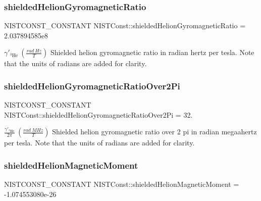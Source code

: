 \subsubsection{\texorpdfstring{shielded\+Helion\+Gyromagnetic\+Ratio}{shieldedHelionGyromagneticRatio}}
{\footnotesize\ttfamily N\+I\+S\+T\+C\+O\+N\+S\+T\+\_\+\+C\+O\+N\+S\+T\+A\+NT N\+I\+S\+T\+Const\+::shielded\+Helion\+Gyromagnetic\+Ratio = 2.\+037894585e8}

$\gamma'_{^3\textrm{He}} \ (\frac{rad\ Hz}{T})$ Shielded helion gyromagnetic ratio in radian hertz per tesla. Note that the units of radians are added for clarity. \mbox{\label{group___n_i_s_t_const-_helion_gae89da246fab4d96613f6365bc4c895cf}} 
\subsubsection{\texorpdfstring{shielded\+Helion\+Gyromagnetic\+Ratio\+Over2\+Pi}{shieldedHelionGyromagneticRatioOver2Pi}}
{\footnotesize\ttfamily N\+I\+S\+T\+C\+O\+N\+S\+T\+\_\+\+C\+O\+N\+S\+T\+A\+NT N\+I\+S\+T\+Const\+::shielded\+Helion\+Gyromagnetic\+Ratio\+Over2\+Pi = 32.}

$\frac{\gamma'_{^3\textrm{He}}}{2 \pi} \ (\frac{rad\ MHz}{T})$ Shielded helion gyromagnetic ratio over 2 pi in radian megaahertz per tesla. Note that the units of radians are added for clarity. \mbox{\label{group___n_i_s_t_const-_helion_ga425da6143b23f32e91a4bed842e2f6d5}} 
\subsubsection{\texorpdfstring{shielded\+Helion\+Magnetic\+Moment}{shieldedHelionMagneticMoment}}
{\footnotesize\ttfamily N\+I\+S\+T\+C\+O\+N\+S\+T\+\_\+\+C\+O\+N\+S\+T\+A\+NT N\+I\+S\+T\+Const\+::shielded\+Helion\+Magnetic\+Moment = -\/1.\+074553080e-\/26}

